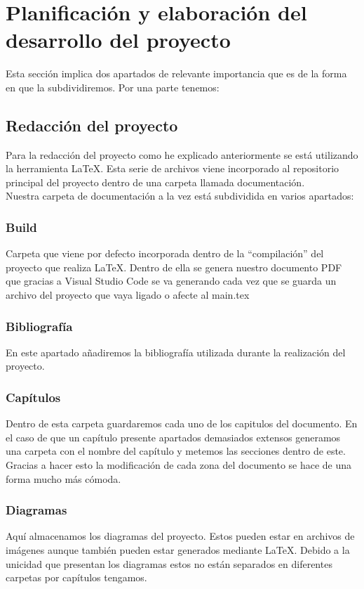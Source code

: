 \section{Planificación y elaboración del desarrollo del proyecto}

Esta sección implica dos apartados de relevante importancia que es de la forma en que la subdividiremos. Por una parte tenemos:

\subsection{Redacción del proyecto}

Para la redacción del proyecto como he explicado anteriormente se está utilizando la herramienta LaTeX. Esta serie de archivos viene incorporado al repositorio principal del proyecto dentro de una carpeta llamada documentación.
\\Nuestra carpeta de documentación a la vez está subdividida en varios apartados:

\subsubsection{Build}
Carpeta que viene por defecto incorporada dentro de la ``compilación'' del proyecto que realiza LaTeX. Dentro de ella se genera nuestro documento PDF que gracias a Visual Studio Code se va generando cada vez que se guarda un archivo del proyecto que vaya ligado o afecte al main.tex

\subsubsection{Bibliografía}
En este apartado añadiremos la bibliografía utilizada durante la realización del proyecto.

\subsubsection{Capítulos}
Dentro de esta carpeta guardaremos cada uno de los capitulos del documento. En el caso de que un capítulo presente apartados demasiados extensos generamos una carpeta con el nombre del capítulo y metemos las secciones dentro de este. Gracias a hacer esto la modificación de cada zona del documento se hace de una forma mucho más cómoda.

\subsubsection{Diagramas}
Aquí almacenamos los diagramas del proyecto. Estos pueden estar en archivos de imágenes aunque también pueden estar generados mediante LaTeX. Debido a la unicidad que presentan los diagramas estos no están separados en diferentes carpetas por capítulos tengamos.

